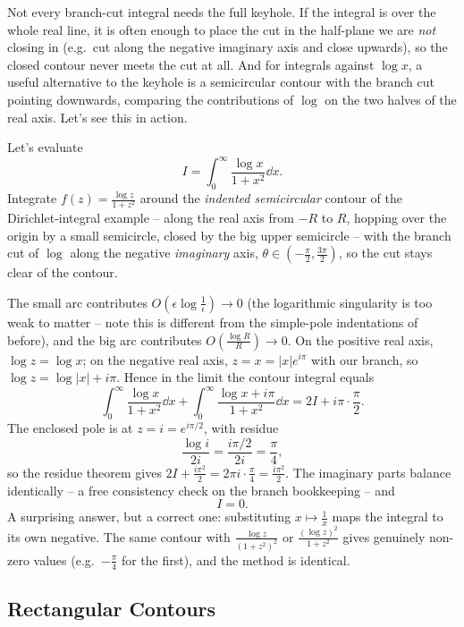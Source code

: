 Not every branch-cut integral needs the full keyhole. If the integral is over the whole real line, it is often enough to place the cut in the half-plane we are \emph{not} closing in (e.g.\ cut along the negative imaginary axis and close upwards), so the closed contour never meets the cut at all. And for integrals against $\log x$, a useful alternative to the keyhole is a semicircular contour with the branch cut pointing downwards, comparing the contributions of $\log$ on the two halves of the real axis. Let's see this in action.

\begin{example}
	Let's evaluate
	$$
	I = \int_0^\infty \frac{\log x}{1 + x^2} \dd x.
	$$
	Integrate $f(z) = \frac{\log z}{1 + z^2}$ around the \emph{indented semicircular} contour of the Dirichlet-integral example -- along the real axis from $-R$ to $R$, hopping over the origin by a small semicircle, closed by the big upper semicircle -- with the branch cut of $\log$ along the negative \emph{imaginary} axis, $\theta \in (-\frac \pi 2, \frac{3\pi}{2})$, so the cut stays clear of the contour.

	The small arc contributes $O(\epsilon \log \frac{1}{\epsilon}) \to 0$ (the logarithmic singularity is too weak to matter -- note this is different from the simple-pole indentations of before), and the big arc contributes $O\left(\frac{\log R}{R}\right) \to 0$. On the positive real axis, $\log z = \log x$; on the negative real axis, $z = x = |x| e^{i\pi}$ with our branch, so $\log z = \log |x| + i\pi$. Hence in the limit the contour integral equals
	$$
	\int_0^\infty \frac{\log x}{1 + x^2}\dd x + \int_0^\infty \frac{\log x + i\pi}{1 + x^2} \dd x = 2I + i\pi \cdot \frac{\pi}{2}.
	$$
	The enclosed pole is at $z = i = e^{i\pi/2}$, with residue
	$$
	\frac{\log i}{2i} = \frac{i\pi/2}{2i} = \frac{\pi}{4},
	$$
	so the residue theorem gives $2I + \frac{i\pi^2}{2} = 2\pi i \cdot \frac \pi 4 = \frac{i \pi^2}{2}$. The imaginary parts balance identically -- a free consistency check on the branch bookkeeping -- and
	$$
	I = 0.
	$$
	A surprising answer, but a correct one: substituting $x \mapsto \frac 1x$ maps the integral to its own negative. The same contour with $\frac{\log z}{(1+z^2)^2}$ or $\frac{(\log z)^2}{1 + z^2}$ gives genuinely non-zero values (e.g.\ $-\frac{\pi}{4}$ for the first), and the method is identical.
\end{example}

\subsection{Rectangular Contours}

